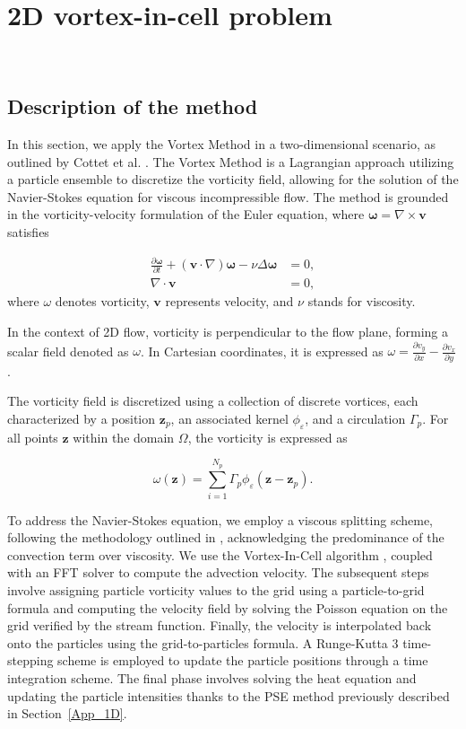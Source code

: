 
\section{2D vortex-in-cell problem}~\label{App_2D}
\subsection{Description of the method}


In this section, we apply the Vortex Method in a two-dimensional scenario, as outlined by Cottet et al. \cite{cottet_vortex_2000}. The Vortex Method is a Lagrangian approach utilizing a particle ensemble to discretize the vorticity field, allowing for the solution of the Navier-Stokes equation for viscous incompressible flow. The method is grounded in the vorticity-velocity formulation of the Euler equation, where $\bm \omega = \nabla \times \bm{v}$ satisfies

\[
	\begin{aligned}
		\frac{\partial \bm \omega}{\partial t} + (\bm{v} \cdot \nabla) \bm \omega - \nu \Delta \bm \omega & = 0, \\
		\nabla \cdot \bm v                                                                                & = 0,
	\end{aligned}
\]where $\omega$ denotes vorticity, $\bm{v}$ represents velocity, and $\nu$ stands for viscosity.

In the context of 2D flow, vorticity is perpendicular to the flow plane, forming a scalar field denoted as $\omega$. In Cartesian coordinates, it is expressed as $\omega = \frac{\partial v_y}{\partial x} - \frac{\partial v_x}{\partial y}$.

The vorticity field is discretized using a collection of discrete vortices, each characterized by a position $\bm z_p$, an associated kernel $\phi_\varepsilon$, and a circulation $\Gamma_p$. For all points $\bm z$ within the domain $\Omega$, the vorticity is expressed as

\begin{equation*}
	\omega(\bm z) = \sum_{i=1}^{N_p} \Gamma_p \phi_\varepsilon(\bm z - \bm z_p).
\end{equation*}

To address the Navier-Stokes equation, we employ a viscous splitting scheme, following the methodology outlined in \cite{cottet_1990}, acknowledging the predominance of the convection term over viscosity. We use the Vortex-In-Cell algorithm \cite{christiansen_1973, birdsall_1969}, coupled with an FFT solver to compute the advection velocity. The subsequent steps involve assigning particle vorticity values to the grid using a particle-to-grid formula and computing the velocity field by solving the Poisson equation on the grid verified by the stream function. Finally, the velocity is interpolated back onto the particles using the grid-to-particles formula. A Runge-Kutta 3 time-stepping scheme is employed to update the particle positions through a time integration scheme. The final phase involves solving the heat equation and updating the particle intensities thanks to the PSE method previously described in Section~\ref{App_1D}.

